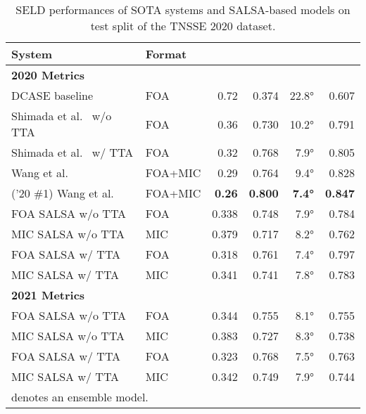 \documentclass[journal]{IEEEtran}
\newcommand{\etalcite}[1]{ et al.~\cite{#1}}
\begin{document}
\begin{table}[t] 
    \setlength{\tabcolsep}{3pt}
    \centering
    \caption{SELD performances of SOTA systems and SALSA-based models on test split of the TNSSE 2020 dataset.}
    \noindent\begin{tabularx}{\columnwidth}{Xlrrrr}
    \toprule 
        System & Format &
         &
         &
        &
         \\
    \midrule
    \bfseries 2020 Metrics \\
        DCASE baseline~\cite{Politis2020ADetection}
            & FOA & 0.72\hphantom{0} & 0.374 & 22.8\si{\degree} & 0.607 \\
        Shimada\etalcite{Shimada2021ACCDOA:Detection} w/o TTA
            & FOA & 0.36\hphantom{0} & 0.730 & 10.2\si{\degree} & 0.791 \\
        Shimada\etalcite{Shimada2021ACCDOA:Detection} w/ TTA
            & FOA &0.32\hphantom{0} & 0.768 & 7.9\si{\degree} & 0.805 \\
        Wang\etalcite{Wang2020TheChallenge}
            & FOA+MIC & 0.29\hphantom{0} & 0.764 & 9.4\si{\degree} & 0.828 \\
        ('20 \#1) Wang\etalcite{Wang2020TheChallenge}  
            & FOA+MIC & \bf{0.26\hphantom{0}} & \bf{0.800} & \bf{7.4\si{\degree}} & \bf{0.847} \\
    \midrule
        FOA SALSA w/o TTA
            & FOA & 0.338 & 0.748 & 7.9\si{\degree} & 0.784 \\
        MIC SALSA w/o TTA
            & MIC & 0.379 & 0.717 & 8.2\si{\degree} & 0.762 \\ 
        FOA SALSA w/ TTA
            & FOA & 0.318 & 0.761 & 7.4\si{\degree} & 0.797 \\
        MIC SALSA w/ TTA
            & MIC & 0.341 & 0.741 & 7.8\si{\degree} & 0.783 \\
    \midrule
    \midrule
    \bfseries 2021 Metrics \\
        FOA SALSA w/o TTA
            & FOA & 0.344 & 0.755 & 8.1\si{\degree} & 0.755 \\
        MIC SALSA w/o TTA
            & MIC & 0.383 & 0.727 & 8.3\si{\degree} & 0.738 \\ 
        FOA SALSA w/ TTA
            & FOA & 0.323 & 0.768 & 7.5\si{\degree} & 0.763 \\
        MIC SALSA w/ TTA
            & MIC & 0.342 & 0.749 & 7.9\si{\degree} & 0.744 \\
    \bottomrule
    \multicolumn{2}{l}{ denotes an ensemble model.}
    \end{tabularx}
    \label{tab:sota_2020_dev}
\end{table}
\end{document}
